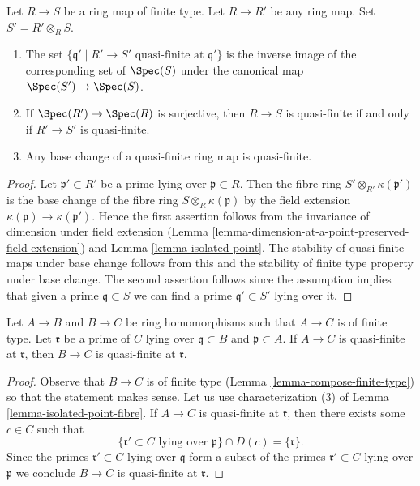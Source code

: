 \begin{lemma}
\label{lemma-quasi-finite-base-change}
Let $R \to S$ be a ring map of finite type.
Let $R \to R'$ be any ring map. Set $S' = R' \otimes_R S$.
\begin{enumerate}
\item The set
$\{\mathfrak q' \mid R' \to S' \text{ quasi-finite at }\mathfrak q'\}$
is the inverse image of the corresponding set of $\Spec(S)$
under the canonical map $\Spec(S') \to \Spec(S)$.
\item If $\Spec(R') \to \Spec(R)$ is surjective,
then $R \to S$ is quasi-finite if and only if $R' \to S'$ is quasi-finite.
\item Any base change of a quasi-finite ring map is quasi-finite.
\end{enumerate}
\end{lemma}

\begin{proof}
Let $\mathfrak p' \subset R'$ be a prime lying over $\mathfrak p \subset R$.
Then the fibre ring $S' \otimes_{R'} \kappa(\mathfrak p')$ is the
base change of the fibre ring $S \otimes_R \kappa(\mathfrak p)$
by the field extension $\kappa(\mathfrak p) \to \kappa(\mathfrak p')$.
Hence the first assertion follows from the invariance of dimension
under field extension
(Lemma \ref{lemma-dimension-at-a-point-preserved-field-extension})
and Lemma \ref{lemma-isolated-point}.
The stability of quasi-finite maps under base change follows from
this and the stability of finite type property under base change.
The second assertion follows
since the assumption implies that given a prime $\mathfrak q \subset S$ we can
find a prime $\mathfrak q' \subset S'$ lying over it.
\end{proof}

\begin{lemma}
\label{lemma-quasi-finite-permanence}
Let $A \to B$ and $B \to C$ be ring homomorphisms such that $A \to C$
is of finite type. Let $\mathfrak r$ be a prime of $C$ lying over
$\mathfrak q \subset B$ and $\mathfrak p \subset A$.
If $A \to C$ is quasi-finite at $\mathfrak r$, then
$B \to C$ is quasi-finite at $\mathfrak r$.
\end{lemma}

\begin{proof}
Observe that $B \to C$ is of finite type
(Lemma \ref{lemma-compose-finite-type})
so that the statement makes sense.
Let us use characterization (3) of Lemma \ref{lemma-isolated-point-fibre}.
If $A \to C$ is quasi-finite at $\mathfrak r$, then
there exists some $c \in C$ such that
$$
\{\mathfrak r' \subset C \text{ lying over }\mathfrak p\} \cap D(c) =
\{\mathfrak{r}\}.
$$
Since the primes $\mathfrak r' \subset C$ lying over $\mathfrak q$
form a subset of the primes $\mathfrak r' \subset C$ lying over
$\mathfrak p$ we conclude $B \to C$ is quasi-finite at $\mathfrak r$.
\end{proof}


